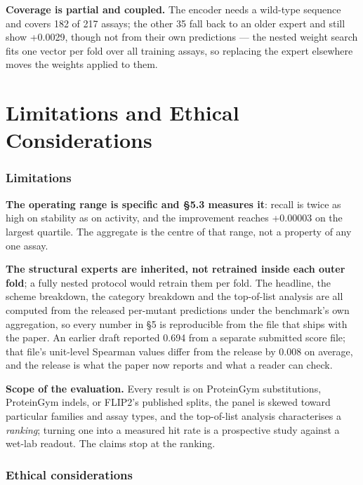 \documentclass{article}
\begin{document}
\textbf{Coverage is partial and coupled.} The encoder needs a wild-type sequence and covers 182 of 217 assays; the other
35 fall back to an older expert and still show +0.0029, though not from their own predictions --- the nested weight
search fits one vector per fold over all training assays, so replacing the expert elsewhere moves the weights
applied to them.

\section{Limitations and Ethical Considerations}\label{limitations-and-ethical-considerations}

\subsubsection*{Limitations}\label{limitations}

\textbf{The operating range is specific and §5.3 measures it}: recall is twice as high on stability as on activity, and
the improvement reaches +0.00003 on the largest quartile. The aggregate is the centre of that range, not a property
of any one assay.

\textbf{The structural experts are inherited, not retrained inside each outer fold}; a fully nested protocol would
retrain them per fold. The headline, the scheme breakdown, the category breakdown and the top-of-list analysis are all computed from the
released per-mutant predictions under the benchmark's own aggregation, so every number in §5 is reproducible from the
file that ships with the paper. An earlier draft reported 0.694 from a separate submitted score file; that file's
unit-level Spearman values differ from the release by 0.008 on average, and the release is what the paper now reports
and what a reader can check.

\textbf{Scope of the evaluation.} Every result is on ProteinGym substitutions, ProteinGym indels, or FLIP2's published
splits, the panel is skewed toward particular families and assay types, and the top-of-list analysis characterises a
\emph{ranking}; turning one into a measured hit rate is a prospective study against a wet-lab readout. The claims stop at
the ranking.

\subsubsection*{Ethical considerations}\label{ethical-considerations}
\end{document}
